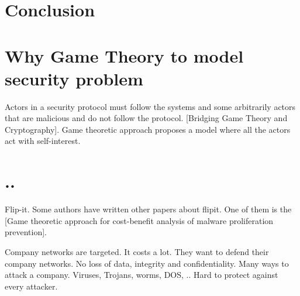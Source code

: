 \section{Conclusion}

\section{Why Game Theory to model security problem}
Actors in a security protocol must follow the systems and some arbitrarily actors that are malicious and do not follow the protocol. [Bridging Game Theory and Cryptography]. Game theoretic approach proposes a model where all the actors act with self-interest. 

\section{..}

Flip-it. Some authors have written other papers about flipit. One of them is the [Game theoretic approach for cost-benefit analysis of malware proliferation prevention]. 


Company networks are targeted. It costs a lot. They want to defend their company networks. No loss of data, integrity and confidentiality.  Many ways to attack a company. Viruses, Trojans, worms, DOS, .. Hard to protect against every attacker.



